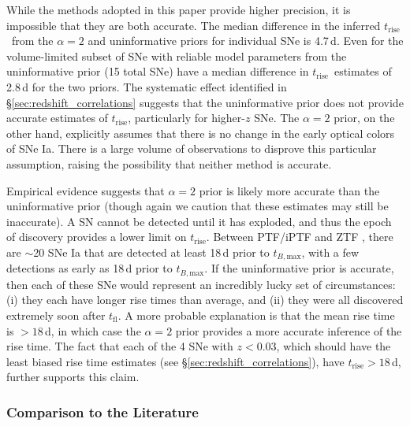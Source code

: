 \documentclass[twocolumn]{./aastex63}
\newcommand{\tfl}{$t_\mathrm{fl}$}
\newcommand{\trise}{$t_\mathrm{rise}$}
\newcommand{\tbmax}{$t_{B,\mathrm{max}}$}
\begin{document}
While the methods adopted in this paper provide higher precision, it is
impossible that they are both accurate. The median difference in the inferred
\trise\ from the $\alpha = 2$ and uninformative priors for individual SNe is
4.7\,d. Even for the volume-limited subset of SNe with reliable model parameters
from the uninformative prior (15 total SNe) have a median difference in \trise\
estimates of 2.8\,d for the two priors. The systematic effect identified in
\S\ref{sec:redshift_correlations} suggests that the uninformative prior does not
provide accurate estimates of \trise, particularly for higher-$z$ SNe. The
$\alpha = 2$ prior, on the other hand, explicitly assumes that there is no
change in the early optical colors of SNe Ia. There is a large volume of
observations to disprove this particular assumption, raising the possibility
that neither method is accurate.

Empirical evidence suggests that $\alpha = 2$ prior is likely more accurate than
the uninformative prior (though again we caution that these estimates may still
be inaccurate). A SN cannot be detected until it has exploded, and thus the
epoch of discovery provides a lower limit on \trise. Between PTF/iPTF
\citep{Papadogiannakis19} and ZTF \citep{Yao19}, there are $\sim$20 SNe Ia that
are detected at least 18\,d prior to \tbmax, with a few detections as early as
18\,d prior to \tbmax. If the uninformative prior is accurate, then each of
these SNe would represent an incredibly lucky set of circumstances: (i) they
each have longer rise times than average, and (ii) they were all discovered
extremely soon after \tfl. A more probable explanation is that the mean rise
time is $> 18$\,d, in which case the $\alpha = 2$ prior provides a more accurate
inference of the rise time. The fact that each of the 4 SNe with $z < 0.03$,
which should have the least biased rise time estimates (see
\S\ref{sec:redshift_correlations}), have \trise$ > 18$\,d, further supports this
claim.

\subsubsection{Comparison to the Literature}
\end{document}
